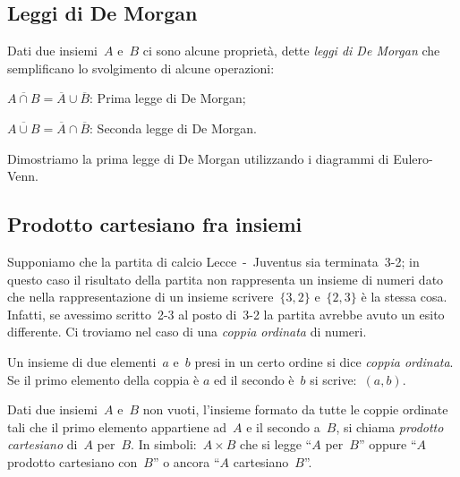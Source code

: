 {%

\subsection{Leggi di De Morgan}
\label{subsec:op_demorgan}

Dati due insiemi~\(A\) e~\(B\) ci sono alcune proprietà,
dette \emph{leggi di De Morgan} che semplificano lo svolgimento di alcune 
operazioni:


\begin{enumeratea}
\item \(\overline{{A\cap B}}=\overline{A}\cup \overline{B}\): 
Prima legge di De Morgan;
\item \(\overline{{A\cup B}}=\overline{A}\cap \overline{B}\): 
Seconda legge di De Morgan.
\end{enumeratea}

Dimostriamo la prima legge di De Morgan utilizzando i diagrammi di 
Eulero-Venn.
\begin{center}
 
\end{center}


\subsection{Prodotto cartesiano fra insiemi}
\label{subsec:op_cartesiano}

Supponiamo che la partita di calcio Lecce~-~Juventus sia terminata~3-2; 
in questo caso il risultato della partita non rappresenta un insieme di 
numeri dato che nella rappresentazione di un insieme 
scrivere~\(\{3,2\}\) e~\(\{2,3\}\) è la stessa cosa. 
Infatti, se avessimo scritto~2-3 al posto di~3-2 la partita avrebbe avuto 
un esito differente. 
Ci troviamo nel caso di una \emph{coppia ordinata} di numeri.

\begin{definizione}
Un insieme di due elementi~\(a\) e~\(b\)
presi in un certo ordine si dice \emph{coppia ordinata}. Se il primo 
elemento della coppia è \(a\) ed il secondo è~\(b\) si scrive:~\((a,b)\).
\end{definizione}


\begin{definizione}
Dati due insiemi~\(A\) e~\(B\) non vuoti,
l'insieme formato da tutte le coppie ordinate tali che
il primo elemento appartiene ad~\(A\) e il secondo a~\(B\), si chiama
\emph{prodotto cartesiano} di~\(A\) per~\(B\). In simboli:~\(A\times B\) 
che si legge ``\(A\) per~\(B\)'' oppure ``\(A\) prodotto cartesiano 
con~\(B\)'' o ancora ``\(A\) cartesiano~\(B\)''.
\end{definizione}

}
